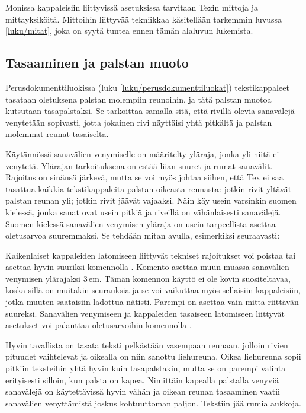 Monissa kappaleisiin liittyvissä asetuksissa tarvitaan Texin mittoja ja
mittayksiköitä. Mittoihin liittyvää tekniikkaa käsitellään tarkemmin
luvussa \ref{luku/mitat}, joka on syytä tuntea ennen tämän alaluvun
lukemista.

\subsection{Tasaaminen ja palstan muoto}
\label{luku/kappaleen-tasaus}

Perusdokumenttiluokissa (luku \ref{luku/perusdokumenttiluokat})
tekstikappaleet tasataan oletuksena palstan molempiin reunoihin, ja tätä
palstan muotoa kutsutaan tasapalstaksi. Se tarkoittaa samalla sitä, että
rivillä olevia sanavälejä venytetään sopivasti, jotta jokainen rivi
näyttäisi yhtä pitkältä ja palstan molemmat reunat tasaiselta.

Käytännössä sanavälien venymiselle on määritelty yläraja, jonka yli
niitä ei venytetä. Ylärajan tarkoituksena on estää liian suuret ja rumat
sanavälit. Rajoitus on sinänsä järkevä, mutta se voi myös johtaa siihen,
että Tex ei saa tasattua kaikkia tekstikappaleita palstan oikeasta
reunasta: jotkin rivit yltävät palstan reunan yli; jotkin rivit jäävät
vajaaksi. Näin käy usein varsinkin suomen kielessä, jonka sanat ovat
usein pitkiä ja riveillä on vähänlaisesti sanavälejä. Suomen kielessä
sanavälien venymisen yläraja on usein tarpeellista asettaa oletusarvoa
suuremmaksi. Se tehdään mitan  avulla,
esimerkiksi seuraavasti:

\begin{koodilohkosis}
\setlength{\emergencystretch}{1em}
\end{koodilohkosis}

Kaikenlaiset kappaleiden latomiseen liittyvät tekniset rajoitukset voi
poistaa tai asettaa hyvin suuriksi komennolla . Komento
asettaa muun muassa sanavälien venymisen ylärajaksi 3\,em. Tämän
komennon käyttö ei ole kovin suositeltavaa, koska sillä on muitakin
seurauksia ja se voi vaikuttaa myös sellaisiin kappaleisiin, jotka
muuten saataisiin ladottua nätisti. Parempi on asettaa vain mitta
 riittävän suureksi. Sanavälien venymiseen ja
kappaleiden tasaiseen latomiseen liittyvät asetukset voi palauttaa
oletusarvoihin komennolla .

Hyvin tavallista on tasata teksti pelkästään vasempaan reunaan, jolloin
rivien pituudet vaihtelevat ja oikealla on niin sanottu liehureuna.
Oikea liehureuna sopii pitkiin teksteihin yhtä hyvin kuin tasapalstakin,
mutta se on parempi valinta erityisesti silloin, kun palsta on kapea.
Nimittäin kapealla palstalla venyviä sanavälejä on käytettävissä hyvin
vähän ja oikean reunan tasaaminen vaatii sanavälien venyttämistä joskus
kohtuuttoman paljon. Tekstiin jää rumia aukkoja.

